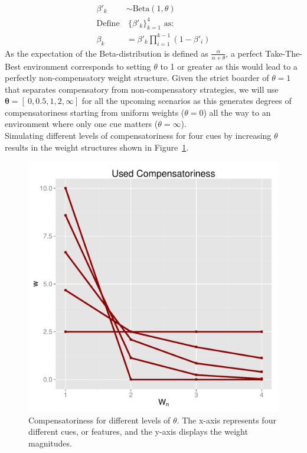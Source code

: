 \documentclass[10pt,letterpaper]{article}
\begin{document}
\begin{align}
\beta'_k &\sim \text{Beta}(1,\theta)\\
\text{Define}&~ \{\beta'_k\}^4_{k=1}\text{ as:}\\
\beta_k&=\beta'_k\prod_{i=1}^{k-1}(1-\beta'_i) 
\end{align}
As the expectation of the Beta-distribution is defined as $\frac{\alpha}{\alpha+\theta}$, a perfect  Take-The-Best environment corresponds to setting $\theta$ to 1 or greater as this would lead to a perfectly non-compensatory weight structure. Given the strict boarder of $\theta=1$ that separates compensatory from non-compensatory strategies, we will use $\mathbf{\theta}=[~0,0.5,1,2,\infty]$ for all the upcoming scenarios as this generates degrees of compensatoriness starting from uniform weights ($\theta=0$) all the way to an environment where only one cue matters ($\theta=\infty$).\\
Simulating different levels of compensatoriness for four cues by increasing $\theta$ results in the weight structures shown in Figure~\ref{comp}.  
\begin{figure}[htb!]
  \centering
    \caption{Compensatoriness for different levels of $\theta$. The x-axis represents four different cues, or features, and the y-axis displays the weight magnitudes.}
\label{comp}
    \includegraphics[scale=0.4]{comp.pdf}

\end{figure}
\noindent
\end{document}
